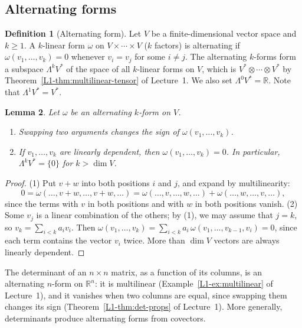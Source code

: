 \documentclass[11pt]{article}
\theoremstyle{definition}
\newtheorem{definition}{Definition}[section]
\theoremstyle{plain}
\newtheorem{lemma}[definition]{Lemma}
\theoremstyle{remark}
\begin{document}
\subsection{Alternating forms}

\begin{definition}[Alternating form]\label{def:alternating}
    Let $V$ be a finite-dimensional vector space and $k \geq 1$. A $k$-linear form $\omega$ on $V \times \cdots \times V$ ($k$ factors) is alternating if $\omega(v_1, \ldots, v_k) = 0$ whenever $v_i = v_j$ for some $i \neq j$. The alternating $k$-forms form a subspace $\Lambda^k V^*$ of the space of all $k$-linear forms on $V$, which is $V^* \otimes \cdots \otimes V^*$ by Theorem~\ref{L1-thm:multilinear-tensor} of Lecture~1. We also set $\Lambda^0 V^* = \mathbb{R}$. Note that $\Lambda^1 V^* = V^*$.
\end{definition}

\begin{lemma}\label{lem:alternating}
    Let $\omega$ be an alternating $k$-form on $V$.
    \begin{enumerate}
        \item Swapping two arguments changes the sign of $\omega(v_1, \ldots, v_k)$.
        \item If $v_1, \ldots, v_k$ are linearly dependent, then $\omega(v_1, \ldots, v_k) = 0$. In particular, $\Lambda^k V^* = \{0\}$ for $k > \dim V$.
    \end{enumerate}
\end{lemma}

\begin{proof}
    (1) Put $v + w$ into both positions $i$ and $j$, and expand by multilinearity:
    \[0 = \omega(\ldots, v + w, \ldots, v + w, \ldots) = \omega(\ldots, v, \ldots, w, \ldots) + \omega(\ldots, w, \ldots, v, \ldots),\]
    since the terms with $v$ in both positions and with $w$ in both positions vanish. (2) Some $v_j$ is a linear combination of the others; by (1), we may assume that $j = k$, so $v_k = \sum_{i < k} a_iv_i$. Then $\omega(v_1, \ldots, v_k) = \sum_{i < k} a_i\,\omega(v_1, \ldots, v_{k-1}, v_i) = 0$, since each term contains the vector $v_i$ twice. More than $\dim V$ vectors are always linearly dependent.
\end{proof}

The determinant of an $n \times n$ matrix, as a function of its columns, is an alternating $n$-form on $\mathbb{R}^n$: it is multilinear (Example~\ref{L1-ex:multilinear} of Lecture~1), and it vanishes when two columns are equal, since swapping them changes its sign (Theorem~\ref{L1-thm:det-props} of Lecture~1). More generally, determinants produce alternating forms from covectors.
\end{document}
